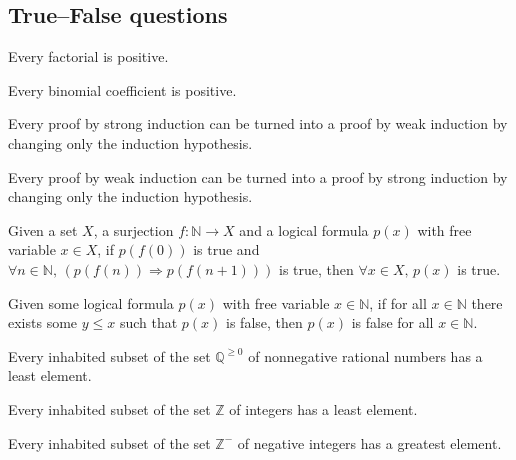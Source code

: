 \subsection*{True--False questions}


\begin{chapex} %
\label{cqInductionTFBegin}
Every factorial is positive.
\end{chapex}

\begin{chapex} %
Every binomial coefficient is positive.
\end{chapex}

\begin{chapex} %
Every proof by strong induction can be turned into a proof by weak induction by changing only the induction hypothesis.
\end{chapex}

\begin{chapex} %
Every proof by weak induction can be turned into a proof by strong induction by changing only the induction hypothesis.
\end{chapex}

\begin{chapex} %
Given a set $X$, a surjection $f : \mathbb{N} \to X$ and a logical formula $p(x)$ with free variable $x \in X$, if $p(f(0))$ is true and $\forall n \in \mathbb{N},\, (p(f(n)) \Rightarrow p(f(n+1)))$ is true, then $\forall x \in X,\, p(x)$ is true.
\end{chapex}

\begin{chapex} %
Given some logical formula $p(x)$ with free variable $x \in \mathbb{N}$, if for all $x \in \mathbb{N}$ there exists some $y \le x$ such that $p(x)$ is false, then $p(x)$ is false for all $x \in \mathbb{N}$.
\end{chapex}

\begin{chapex} %
Every inhabited subset of the set $\mathbb{Q}^{\ge 0}$ of nonnegative rational numbers has a least element. 
\end{chapex}

\begin{chapex} %
Every inhabited subset of the set $\mathbb{Z}$ of integers has a least element.
\end{chapex}

\begin{chapex} %
\label{cqInductionTFEnd}
Every inhabited subset of the set $\mathbb{Z}^{-}$ of negative integers has a greatest element.
\end{chapex}

